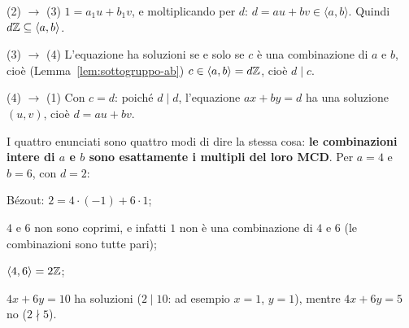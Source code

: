 \begin{concetto}
\begin{dimostrazione}
\begin{caso}{(2) $\rightarrow$ (3)}
        $1 = a_1 u + b_1 v$, e moltiplicando per $d$: $d = au + bv \in \langle a, b \rangle$. Quindi $d\mathbb{Z} \subseteq \langle a, b \rangle$.
    \end{caso}
    \begin{caso}{(3) $\rightarrow$ (4)}
        L'equazione ha soluzioni se e solo se $c$ è una combinazione di $a$ e $b$, cioè (Lemma~\ref{lem:sottogruppo-ab}) $c \in \langle a, b \rangle = d\mathbb{Z}$,
        cioè $d \mid c$.
    \end{caso}
    \begin{caso}{(4) $\rightarrow$ (1)}
        Con $c = d$: poiché $d \mid d$, l'equazione $ax + by = d$ ha una soluzione $(u, v)$, cioè $d = au + bv$.
    \end{caso}
\end{dimostrazione}
\end{concetto}

\begin{spiegazione}
    I quattro enunciati sono quattro modi di dire la stessa cosa: \textbf{le combinazioni intere di $a$ e $b$ sono esattamente i multipli
    del loro MCD}. Per $a = 4$ e $b = 6$, con $d = 2$:
    \begin{passi}
        \item Bézout: $2 = 4 \cdot (-1) + 6 \cdot 1$;
        \item $4$ e $6$ non sono coprimi, e infatti $1$ non è una combinazione di $4$ e $6$ (le combinazioni sono tutte pari);
        \item $\langle 4, 6 \rangle = 2\mathbb{Z}$;
        \item $4x + 6y = 10$ ha soluzioni ($2 \mid 10$: ad esempio $x = 1$, $y = 1$), mentre $4x + 6y = 5$ no ($2 \nmid 5$).
    \end{passi}
\end{spiegazione}

